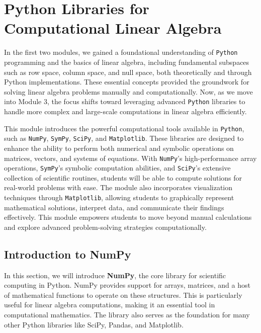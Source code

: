 \documentclass[
  letterpaper,
  DIV=11,
  numbers=noendperiod]{scrreprt}
\theoremstyle{plain}
\theoremstyle{definition}
\theoremstyle{remark}
\begin{document}
\chapter{Python Libraries for Computational Linear
Algebra}\label{python-libraries-for-computational-linear-algebra}

In the first two modules, we gained a foundational understanding of
\texttt{Python} programming and the basics of linear algebra, including
fundamental subspaces such as row space, column space, and null space,
both theoretically and through Python implementations. These essential
concepts provided the groundwork for solving linear algebra problems
manually and computationally. Now, as we move into Module 3, the focus
shifts toward leveraging advanced \texttt{Python} libraries to handle
more complex and large-scale computations in linear algebra efficiently.

This module introduces the powerful computational tools available in
\texttt{Python}, such as \texttt{NumPy}, \texttt{SymPy}, \texttt{SciPy},
and \texttt{Matplotlib}. These libraries are designed to enhance the
ability to perform both numerical and symbolic operations on matrices,
vectors, and systems of equations. With \texttt{NumPy}'s
high-performance array operations, \texttt{SymPy}'s symbolic computation
abilities, and \texttt{SciPy}'s extensive collection of scientific
routines, students will be able to compute solutions for real-world
problems with ease. The module also incorporates visualization
techniques through \texttt{Matplotlib}, allowing students to graphically
represent mathematical solutions, interpret data, and communicate their
findings effectively. This module empowers students to move beyond
manual calculations and explore advanced problem-solving strategies
computationally.

\section{Introduction to NumPy}\label{introduction-to-numpy}

In this section, we will introduce \textbf{NumPy}, the core library for
scientific computing in Python. NumPy provides support for arrays,
matrices, and a host of mathematical functions to operate on these
structures. This is particularly useful for linear algebra computations,
making it an essential tool in computational mathematics. The library
also serves as the foundation for many other Python libraries like
SciPy, Pandas, and Matplotlib.
\end{document}
